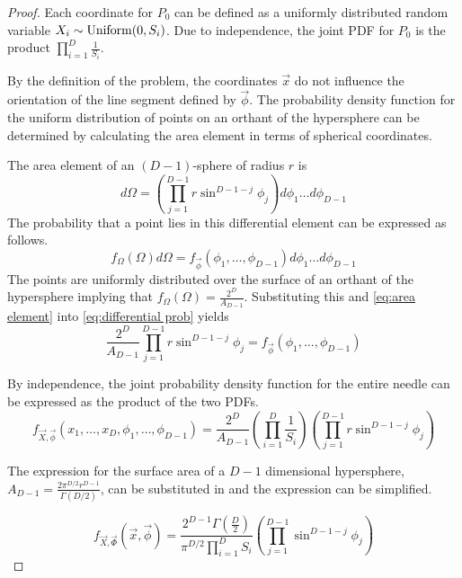 \documentclass{article}
\begin{document}
\begin{proof}
	Each coordinate for $P_0$ can be defined as a uniformly distributed random 
	variable $X_i\sim{\rm Uniform}(0,S_i)$. Due to independence, the joint PDF 
	for $P_0$ is the product $\prod_{i=1}^D \frac{1}{S_i}$. 
	
	By the definition of the problem, the coordinates $\vec{x}$ do not influence 
	the orientation of the line segment defined by $\vec{\phi}$. The probability 
	density function for the uniform distribution of points on an orthant of the 
	hypersphere can be determined by calculating the area element in terms of 
	spherical coordinates.

	The area element of an $(D-1)$-sphere of radius $r$ is
	\begin{equation} \label{eq:area element}
		d\Omega = \left(\prod_{j=1}^{D-1}r\sin^{D-1-j}\phi_j\right)d\phi_1 \hdots d\phi_{D-1}
	\end{equation}
	The probability that a point lies in this differential element can be expressed as follows.
	\begin{equation} \label{eq:differential prob}
		f_{\Omega}(\Omega)d\Omega = f_{\vec{\phi}}(\phi_1, \hdots, \phi_{D-1})d\phi_1 \hdots d\phi_{D-1}
	\end{equation}
	The points are uniformly distributed over the surface of an orthant of the hypersphere
	implying that $f_{\Omega}(\Omega) = \frac{2^D}{A_{D-1}}$. Substituting this and
	\ref{eq:area element} into \ref{eq:differential prob} yields
	\begin{equation}
		\frac{2^D}{A_{D-1}}\prod_{j=1}^{D-1}r\sin^{D-1-j}\phi_j = f_{\vec{\phi}}(\phi_1, \hdots, \phi_{D-1})
	\end{equation}

	By independence, the joint probability density function for the entire needle
	can be expressed as the product of the two PDFs.
	\begin{equation} 
		f_{\vec{X},\vec{\phi}}(x_1, \hdots, x_D, \phi_1, \hdots, \phi_{D-1}) = \frac{2^D}{A_{D-1}}\left(\prod_{i=1}^D\frac{1}{S_i}\right)\left(\prod_{j=1}^{D-1}r\sin^{D-1-j}\phi_j\right)
	\end{equation}

	The expression for the surface area of a $D-1$ dimensional hypersphere, 
	$A_{D-1}=\frac{2\pi^{D/2}r^{D-1}}{\Gamma(D/2)}$,
	can be substituted in and the expression can be simplified.

	\begin{equation}\label{eq:general pdf}
		f_{\vec{X},\vec{\Phi}}(\vec{x}, \vec{\phi}) = \frac{2^{D-1}\Gamma(\frac{D}{2})}{\pi^{D/2}\prod_{i=1}^DS_i} \left(\prod_{j=1}^{D-1}\sin^{D-1-j}\phi_j\right)
	\end{equation}
\end{proof}
\end{document}
